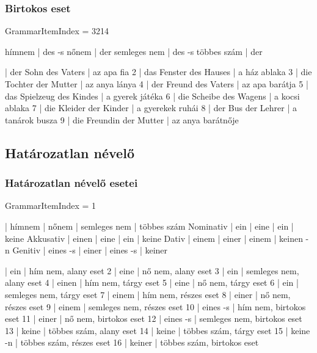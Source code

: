 \documentclass{article}
\newenvironment{desc}{\verbatim}{\endverbatim}
\newenvironment{exmp}{\verbatim}{\endverbatim}
\begin{document}
\subsubsection{Birtokos eset}

GrammarItemIndex = 3214

\begin{desc}
hímnem       | des -s
nőnem        | der
semleges nem | des -s
többes szám  | der
\end{desc}

\begin{exmp}
1 | der Sohn des Vaters | az apa fia
2 | das Fenster des Hauses | a ház ablaka
3 | die Tochter der Mutter | az anya lánya
4 | der Freund des Vaters | az apa barátja
5 | das Spielzeug des Kindes | a gyerek játéka
6 | die Scheibe des Wagens | a kocsi ablaka
7 | die Kleider der Kinder | a gyerekek ruhái
8 | der Bus der Lehrer | a tanárok busza
9 | die Freundin der Mutter | az anya barátnője
\end{exmp}

\subsection{Határozatlan névelő}

\subsubsection{Határozatlan névelő esetei}

GrammarItemIndex = 1

\begin{desc}
          | hímnem   | nőnem | semleges nem | többes szám
Nominativ | ein      | eine  | ein          | keine
Akkusativ | einen    | eine  | ein          | keine
Dativ     | einem    | einer | einem        | keinen -n
Genitiv   | eines -s | einer | eines -s     | keiner
\end{desc}

\begin{exmp}
1 | ein | hím nem, alany eset
2 | eine | nő nem, alany eset
3 | ein | semleges nem, alany eset
4 | einen | hím nem, tárgy eset
5 | eine | nő nem, tárgy eset
6 | ein | semleges nem, tárgy eset
7 | einem | hím nem, részes eset
8 | einer | nő nem, részes eset
9 | einem | semleges nem, részes eset
10 | eines -s | hím nem, birtokos eset
11 | einer | nő nem, birtokos eset
12 | eines -s | semleges nem, birtokos eset
13 | keine | többes szám, alany eset
14 | keine | többes szám, tárgy eset
15 | keine -n | többes szám, részes eset
16 | keiner | többes szám, birtokos eset
\end{exmp}
\end{document}
